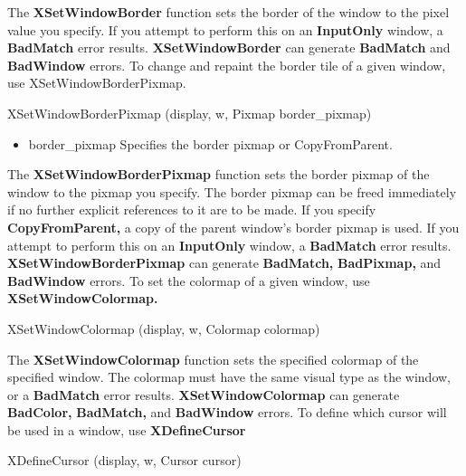 \documentclass{report}
\begin{document}
\begin{itemize}
\begin{itemize}
            \end{itemize}
            The \textbf{XSetWindowBorder} function sets the border of the window to the pixel value you specify. If you attempt to perform this on an \textbf{InputOnly} window, a \textbf{BadMatch} error results.
            \bigbreak \noindent 
            \textbf{XSetWindowBorder} can generate \textbf{BadMatch} and \textbf{BadWindow} errors.
            \bigbreak \noindent 
            To change and repaint the border tile of a given window, use XSetWindowBorderPixmap.
            \bigbreak \noindent 
            \begin{cppcode}
                XSetWindowBorderPixmap (display, w, Pixmap border_pixmap)
            \end{cppcode}
            \begin{itemize}
                \item border\_pixmap Specifies the border pixmap or CopyFromParent.
            \end{itemize}
            The \textbf{XSetWindowBorderPixmap} function sets the border pixmap of the window to the pixmap you specify. The border pixmap can be freed immediately if no further explicit references to it are to be made. If you specify \textbf{CopyFromParent,} a copy of the parent window’s border pixmap is used. If you attempt to perform this on an \textbf{InputOnly} window, a \textbf{BadMatch} error results.
            \bigbreak \noindent 
            \textbf{XSetWindowBorderPixmap} can generate \textbf{BadMatch,} \textbf{BadPixmap,} and \textbf{BadWindow} errors.
            \bigbreak \noindent 
            To set the colormap of a given window, use \textbf{XSetWindowColormap.}
            \bigbreak \noindent 
            \begin{cppcode}
                XSetWindowColormap (display, w, Colormap colormap)
            \end{cppcode}
            The \textbf{XSetWindowColormap} function sets the specified colormap of the specified window. The colormap must have the same visual type as the window, or a \textbf{BadMatch} error results.
            \bigbreak \noindent 
            \textbf{XSetWindowColormap} can generate \textbf{BadColor,} \textbf{BadMatch,} and \textbf{BadWindow} errors.
            \bigbreak \noindent 
            To define which cursor will be used in a window, use \textbf{XDefineCursor}
            \bigbreak \noindent 
            \begin{cppcode}
                XDefineCursor (display, w, Cursor cursor)

\end{cppcode}
\end{itemize}
\end{document}
